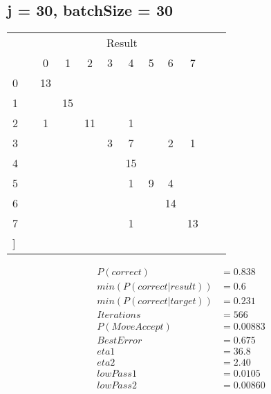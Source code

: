 \documentclass[10pt, conference, compsocconf]{IEEEtran}
\begin{document}
\subsection{j = 30, batchSize = 30}
\begin{center}
\begin{tabular}{l*{10}{c}r}
& & & & & \multicolumn{2}{c}{Result}  & & \\
 &\vline& 0 & 1 & 2 & 3 & 4 & 5 & 6 & 7 \\
\hline
 0 &\vline& 13&    &    &    &    &    &    &    \\
 1 &\vline&   &  15&    &    &    &    &    &    \\
 2 &\vline&  1&    &  11&    &   1&    &    &    \\
 3 &\vline&   &    &    &   3&   7&    &   2&   1 \\
 4 &\vline&   &    &    &    &  15&    &    &    \\
 5 &\vline&   &    &    &    &   1&   9&   4&    \\
 6 &\vline&   &    &    &    &    &    &  14&    \\
 7 &\vline&   &    &    &    &   1&    &    &  13 \\]
\end{tabular}
\begin{align}
P( correct )  &=   0.838\\
min( P( correct |  result  ) )  &=   0.6\\
min( P( correct | target ) )  &=   0.231\\
Iterations &=   566\\
P(Move Accept) &=   0.00883\\
Best Error &=   0.675\\
eta1    &=    36.8\\
eta2    &=  2.40\\
lowPass1 &= 0.0105\\
lowPass2 &= 0.00860
\end{align}
\end{center}
\end{document}
